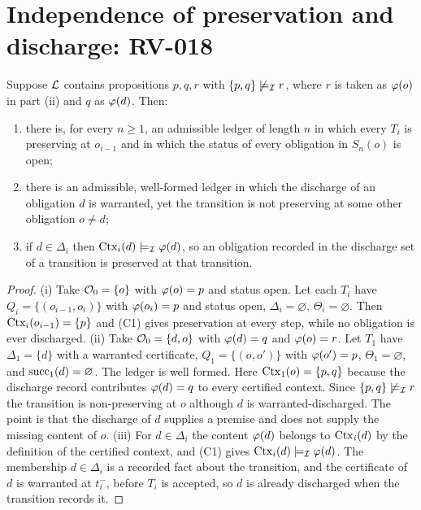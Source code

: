\section{Independence of preservation and discharge: RV-018}

\begin{proposition}[Independence, RV-018]
\label{prop:independence}
Suppose $\mathcal{L}$ contains propositions $p, q, r$ with $\{p,q\} \not\models_{\mathcal{I}} r$, where $r$ is taken as $\varphi(o)$ in part (ii) and $q$ as $\varphi(d)$. Then:
\begin{enumerate}[label=(\roman*), leftmargin=2.4em]
\item there is, for every $n\ge1$, an admissible ledger of length $n$ in which every $T_i$ is preserving at $o_{i-1}$ and in which the status of every obligation in $S_n(o)$ is \textsf{open};
\item there is an admissible, well-formed ledger in which the discharge of an obligation $d$ is warranted, yet the transition is not preserving at some other obligation $o \neq d$;
\item if $d \in \Delta_i$ then $\operatorname{Ctx}_i(d) \models_{\mathcal{I}} \varphi(d)$, so an obligation recorded in the discharge set of a transition is preserved at that transition.
\end{enumerate}
\end{proposition}

\begin{proof}
(i) Take $\mathcal{O}_0 = \{o\}$ with $\varphi(o) = p$ and status \textsf{open}. Let each $T_i$ have $Q_i = \{(o_{i-1}, o_i)\}$ with $\varphi(o_i) = p$ and status \textsf{open}, $\Delta_i = \varnothing$, $\Theta_i = \varnothing$. Then $\operatorname{Ctx}_i(o_{i-1}) = \{p\}$ and (C1) gives preservation at every step, while no obligation is ever discharged. (ii) Take $\mathcal{O}_0 = \{d, o\}$ with $\varphi(d) = q$ and $\varphi(o) = r$. Let $T_1$ have $\Delta_1 = \{d\}$ with a warranted certificate, $Q_1 = \{(o, o')\}$ with $\varphi(o') = p$, $\Theta_1 = \varnothing$, and $\operatorname{succ}_1(d) = \varnothing$. The ledger is well formed. Here $\operatorname{Ctx}_1(o) = \{p, q\}$ because the discharge record contributes $\varphi(d) = q$ to every certified context. Since $\{p,q\} \not\models_{\mathcal{I}} r$ the transition is non-preserving at $o$ although $d$ is warranted-discharged. The point is that the discharge of $d$ supplies a premise and does not supply the missing content of $o$. (iii) For $d \in \Delta_i$ the content $\varphi(d)$ belongs to $\operatorname{Ctx}_i(d)$ by the definition of the certified context, and (C1) gives $\operatorname{Ctx}_i(d) \models_{\mathcal{I}} \varphi(d)$. The membership $d\in\Delta_i$ is a recorded fact about the transition, and the certificate of $d$ is warranted at $t_i^-$, before $T_i$ is accepted, so $d$ is already discharged when the transition records it.
\end{proof}

